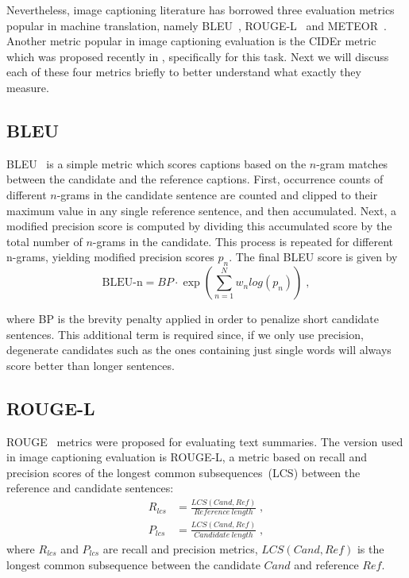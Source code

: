 Nevertheless, image captioning literature has borrowed three evaluation metrics
popular in machine translation, namely BLEU~\cite{Papineni:BLEU},
ROUGE-L~\cite{lin2004rouge} and METEOR~\cite{denkowski-lavie:2014:Meteor}.
Another metric popular in image captioning evaluation is the CIDEr metric which
was proposed recently in \cite{Vedantam_2015_CVPR}, specifically for this task.
Next we will discuss each of these four metrics briefly to better understand
what exactly they measure.

\subsection{BLEU}

BLEU~\cite{Papineni:BLEU} is a simple metric which scores captions based on the
$n$-gram matches between the candidate and the reference captions.
First, occurrence counts of different $n$-grams in the candidate sentence are
counted and clipped to their maximum value in any single reference sentence,
and then accumulated.
Next, a modified precision score is computed by dividing this accumulated score
by the total number of $n$-grams in the candidate.
This process is repeated for different n-grams, yielding modified precision
scores $p_n$.
The final BLEU score is given by
\begin{equation}
    \text{BLEU-n} = BP\cdot{}\exp(\sum_{n=1}^{N}w_{n}log(p_n)) \; ,
\end{equation}

\noindent where BP is the brevity penalty applied in order to penalize
short candidate sentences.
This additional term is required since, if we only use precision, degenerate
candidates such as the ones containing just single words will always score
better than longer sentences.
\subsection{ROUGE-L}
ROUGE~\cite{lin2004rouge} metrics were proposed for evaluating text summaries.
The version used in image captioning evaluation is ROUGE-L, a metric based on
recall and precision scores of the longest common subsequences~(LCS) between the
reference and candidate sentences:
\begin{align}
        R_{lcs} &= \frac{LCS(Cand,Ref)}{Reference\ length} \; ,\\[0.75ex]
        P_{lcs} &= \frac{LCS(Cand,Ref)}{Candidate\ length} \; ,
\end{align}
\noindent where $R_{lcs}$ and $P_{lcs}$ are recall and precision metrics,
$LCS(Cand,Ref)$ is the longest common subsequence between the candidate $Cand$ and reference
$Ref$.

